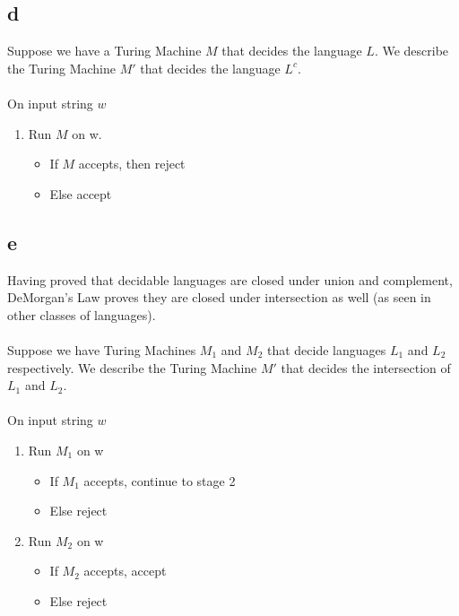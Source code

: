 \documentclass{article}
\begin{document}
\subsection*{d}
Suppose we have a Turing Machine $M$ that decides the language $L$. We describe the Turing Machine $M'$ that decides the language $L^c$.\\\\
On input string $w$
\begin{enumerate}
    \item Run $M$ on w. 
    \begin{itemize}
        \item If $M$ accepts, then reject
        \item Else accept
    \end{itemize}
\end{enumerate}

\subsection*{e}
Having proved that decidable languages are closed under union and complement, DeMorgan's Law proves they are closed under intersection as well (as seen in other classes of languages).\\\\
Suppose we have Turing Machines $M_1$ and $M_2$ that decide languages $L_1$ and $L_2$ respectively. We describe the Turing Machine $M'$ that decides the intersection of $L_1$ and $L_2$.\\\\
On input string $w$
\begin{enumerate}
    \item Run $M_1$ on w 
    \begin{itemize}
        \item If $M_1$ accepts, continue to stage 2
        \item Else reject
    \end{itemize} 
    \item Run $M_2$ on w
    \begin{itemize}
        \item If $M_2$ accepts, accept
        \item Else reject
    \end{itemize}
\end{enumerate}
\end{document}
